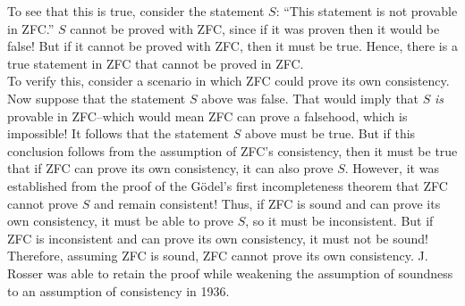 To see that this is true, consider the statement $S$: ``This statement is not provable in ZFC.'' $S$ cannot be proved with ZFC, since if it was proven then it would be false! But if it cannot be proved with ZFC, then it must be true. Hence, there is a true statement in ZFC that cannot be proved in ZFC. \\

To verify this, consider a scenario in which ZFC could prove its own consistency. Now suppose that the statement $S$ above was false. That would imply that $S$ \emph{is} provable in ZFC--which would mean ZFC can prove a falsehood, which is impossible! It follows that the statement $S$ above must be true. But if this conclusion follows from the assumption of ZFC's consistency, then it must be true that if ZFC can prove its own consistency, it can also prove $S$. However, it was established from the proof of the G\"{o}del's first incompleteness theorem that ZFC cannot prove $S$ and remain consistent! Thus, if ZFC is sound and can prove its own consistency, it must be able to prove $S$, so it must be inconsistent. But if ZFC is inconsistent and can prove its own consistency, it must not be sound! Therefore, assuming ZFC is sound, ZFC cannot prove its own consistency. J. Rosser was able to retain the proof while weakening the assumption of soundness to an assumption of consistency in 1936. \\ %

